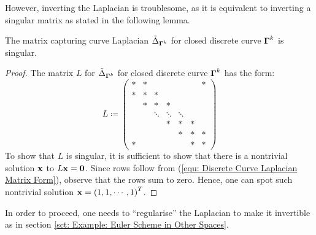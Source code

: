 \documentclass[../dissertation.tex]{subfiles}
\begin{document}
However, inverting the Laplacian is troublesome, as it is equivalent to inverting a singular matrix as stated in the following lemma.
\begin{lemma}
    \label{lemma: Curve Laplacian is Singular}
    The matrix capturing curve Laplacian $\tilde{\Delta}_{\boldsymbol{\Gamma}^k}$ for closed discrete curve $\boldsymbol{\Gamma}^k$ is singular.
\end{lemma}
\begin{proof}
    The matrix $L$ for $\tilde{\Delta}_{\boldsymbol{\Gamma}^k}$ for closed discrete curve $\boldsymbol{\Gamma}^k$ has the form:
    \begin{equation*}
        L \coloneqq
        \begin{pmatrix}
            * & * &   &   &   & & * \\
            * & * & * &   &   & &  \\
            & * & * & * &  &  &   \\
            &   & \ddots  & \ddots & \ddots &  & \\
            &   &   & *  &  * & * & \\
            &  & &  & *  & *  & * \\
            * &   & &  &   & *  & *
        \end{pmatrix}
    \end{equation*}
    To show that $L$ is singular, it is sufficient to show that there is a nontrivial solution $\mathbf{x}$ to $L \mathbf{x} = \mathbf{0}$.
    Since rows follow from (\ref{equ: Discrete Curve Laplacian Matrix Form}),
    observe that the rows sum to zero.
    Hence, one can spot such nontrivial solution $\mathbf{x} = \left( 1, 1, \cdots, 1 \right)^T$.
\end{proof}
In order to proceed, one needs to ``regularise'' the Laplacian to make it invertible as in section \ref{sct: Example: Euler Scheme in Other Spaces}.
\end{document}
